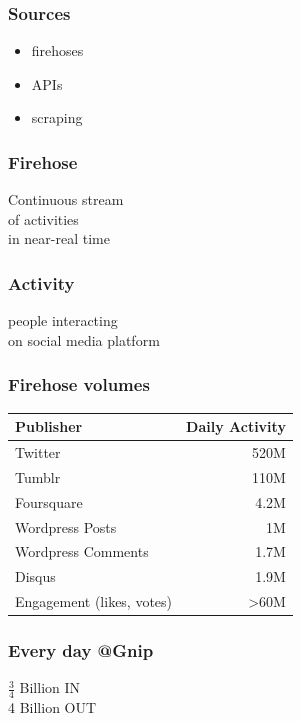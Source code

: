 \documentclass{beamer}
\begin{document}
\begin{frame}\frametitle{Sources}
{\Huge
\begin{itemize}
\item firehoses
\item APIs
\item scraping
\end{itemize}
}
\end{frame}


\begin{frame}\frametitle{Firehose}
\begin{center}
{\Huge Continuous stream \\ [8pt] of activities \\ [15pt] in near-real time}
\end{center}
\end{frame}


\begin{frame}\frametitle{Activity}
\begin{center}
{\Huge people interacting \\ [8pt] on social media platform}
\end{center}
\end{frame}


\begin{frame} \frametitle{Firehose volumes}
\begin{table}
\begin{tabular}{l|r}
\hline
   {Publisher}   &   {Daily Activity}   \\
\hline 
    Twitter      &      520M   \\
    Tumblr      &       110M   \\
    Foursquare &       4.2M \\
    Wordpress Posts &     1M   \\
    Wordpress Comments & 1.7M \\
    Disqus       &       1.9M  \\
    Engagement (likes, votes) & >60M  \\
\hline
\end{tabular}
\end{table}
\end{frame}

%
\begin{frame}\frametitle{Every day @Gnip}
\begin{center}
{\Huge $\frac{3}{4}$ Billion IN \\ [18pt] 4 Billion OUT}
\end{center}
\end{frame}
\end{document}
